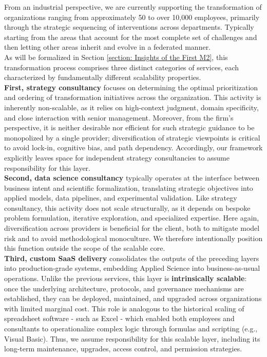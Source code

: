 \documentclass{article}
\begin{document}
From an industrial perspective, we are currently supporting the transformation of organizations ranging from approximately 50 to over 10,000 employees, primarily through the strategic sequencing of interventions across departments. Typically starting from the areas that account for the most complete set of challenges and then letting other areas inherit and evolve in a federated manner.\\

As will be formalized in Section \ref{section: Insights of the First M2}, this transformation process comprises three distinct categories of services, each characterized by fundamentally different scalability properties.\\

\textbf{First, strategy consultancy} focuses on determining the optimal prioritization and ordering of transformation initiatives across the organization. This activity is inherently non-scalable, as it relies on high-context judgment, domain specificity, and close interaction with senior management. Moreover, from the firm’s perspective, it is neither desirable nor efficient for such strategic guidance to be monopolized by a single provider; diversification of strategic viewpoints is critical to avoid lock-in, cognitive bias, and path dependency. Accordingly, our framework explicitly leaves space for independent strategy consultancies to assume responsibility for this layer.\\

\textbf{Second, data science consultancy} typically operates at the interface between business intent and scientific formalization, translating strategic objectives into applied models, data pipelines, and experimental validation. Like strategy consultancy, this activity does not scale structurally, as it depends on bespoke problem formulation, iterative exploration, and specialized expertise. Here again, diversification across providers is beneficial for the client, both to mitigate model risk and to avoid methodological monoculture. We therefore intentionally position this function outside the scope of the scalable core.\\

\textbf{Third, custom SaaS delivery} consolidates the outputs of the preceding layers into production-grade systems, embedding Applied Science into business-as-usual operations. Unlike the previous services, this layer is \textbf{intrinsically scalable}: once the underlying architecture, protocols, and governance mechanisms are established, they can be deployed, maintained, and upgraded across organizations with limited marginal cost. This role is analogous to the historical scaling of spreadsheet software - such as Excel - which enabled both employees and consultants to operationalize complex logic through formulas and scripting (e.g., Visual Basic). Thus, we assume responsibility for this scalable layer, including its long-term maintenance, upgrades, access control, and permission strategies.
\end{document}
